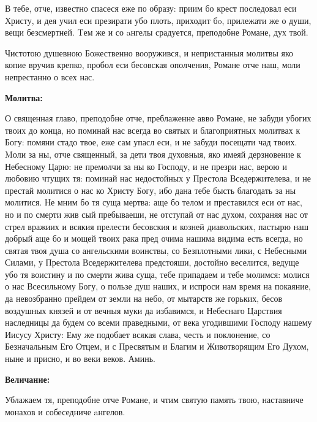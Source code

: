 В тебе, отче, известно спасеся еже по образу: приим бо крест последовал еси Христу,  и дея учил еси презирати убо плоть, приходит бo, прилежати же о души, вещи безсмертней. Tем же и со aнгелы срадуется, преподобне Романе, дух твой.


Чистотою душевною Божественно вооружився, и непристанныя молитвы яко копие вручив крепко, пробол еси бесовская ополчения, Романе отче наш, моли непрестанно о всех нас.


\medskip
\bfseries Молитва:\normalfont{}\nopagebreak


О священная главо, преподобне отче, преблаженне авво Романе, не забуди убогих твоих до конца, но поминай нас всегда во святых и благоприятных молитвах к Богу: помяни стадо твое, еже сам упасл еси, и не забуди посещати чад твоих. Mоли за ны, отче священный, за дети твоя духовныя, яко имеяй дерзновение к Небесному Царю: не премолчи за ны ко Господу, и не презри нас, верою и любовию чтущих тя: поминай нас недостойных у Престола Вседержителева, и не престай молитися о нас ко Христу Богу, ибо дана тебе бысть благодать за ны молитися. Не мним бо тя суща мертва: аще бо телом и преставился еси от нас, но и по смерти жив сый пребываеши, не отступай от нас духом, сохраняя нас от стрел вражиих и всякия прелести бесовския и козней диавольских, пастырю наш добрый аще бо и мощей твоих рака пред очима нашима видима есть всегда, но святая твоя душа со ангельскими воинствы, со Безплотными лики, с Небесными Силами, у Престола Вседержителева предстояши, достойно веселится, ведуще убо тя воистину и по смерти жива суща, тебе припадаем и тебе молимся: молися о нас Всесильному Богу, о пользе душ наших, и испроси нам время на покаяние, да невозбранно прейдем от земли на небо, от мытарств же горьких, бесов воздушных князей и от вечныя муки да избавимся, и Небеснаго Царствия наследницы да будем со всеми праведными, от века угодившими Господу нашему Иисусу Христу: Ему же подобает всякая слава, честь и поклонение, со Безначальным Его Отцем, и с Пресвятым и Благим и Животворящим Его Духом, ныне и присно, и во веки веков. Аминь.


\medskip
\bfseries Величание:\normalfont{}\nopagebreak


Ублажаем тя, преподобне отче Романе, и чтим святую память твою, наставниче монахов и собеседниче aнгелов.

\longpage[2]{}\mychapterending


